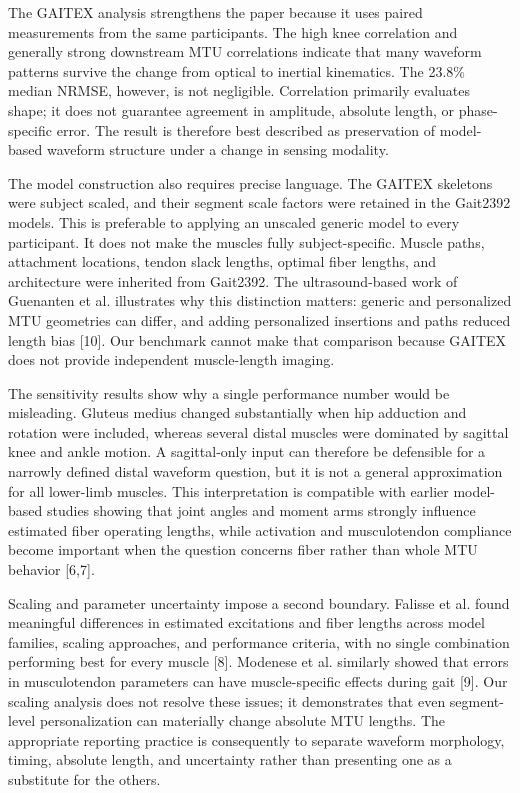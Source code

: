 \documentclass[11pt]{article}
\begin{document}
The GAITEX analysis strengthens the paper because it uses paired measurements from the same participants. The high knee correlation and generally strong downstream MTU correlations indicate that many waveform patterns survive the change from optical to inertial kinematics. The 23.8\% median NRMSE, however, is not negligible. Correlation primarily evaluates shape; it does not guarantee agreement in amplitude, absolute length, or phase-specific error. The result is therefore best described as preservation of model-based waveform structure under a change in sensing modality.

The model construction also requires precise language. The GAITEX skeletons were subject scaled, and their segment scale factors were retained in the Gait2392 models. This is preferable to applying an unscaled generic model to every participant. It does not make the muscles fully subject-specific. Muscle paths, attachment locations, tendon slack lengths, optimal fiber lengths, and architecture were inherited from Gait2392. The ultrasound-based work of Guenanten et al. illustrates why this distinction matters: generic and personalized MTU geometries can differ, and adding personalized insertions and paths reduced length bias [10]. Our benchmark cannot make that comparison because GAITEX does not provide independent muscle-length imaging.

The sensitivity results show why a single performance number would be misleading. Gluteus medius changed substantially when hip adduction and rotation were included, whereas several distal muscles were dominated by sagittal knee and ankle motion. A sagittal-only input can therefore be defensible for a narrowly defined distal waveform question, but it is not a general approximation for all lower-limb muscles. This interpretation is compatible with earlier model-based studies showing that joint angles and moment arms strongly influence estimated fiber operating lengths, while activation and musculotendon compliance become important when the question concerns fiber rather than whole MTU behavior [6,7].

Scaling and parameter uncertainty impose a second boundary. Falisse et al. found meaningful differences in estimated excitations and fiber lengths across model families, scaling approaches, and performance criteria, with no single combination performing best for every muscle [8]. Modenese et al. similarly showed that errors in musculotendon parameters can have muscle-specific effects during gait [9]. Our scaling analysis does not resolve these issues; it demonstrates that even segment-level personalization can materially change absolute MTU lengths. The appropriate reporting practice is consequently to separate waveform morphology, timing, absolute length, and uncertainty rather than presenting one as a substitute for the others.
\end{document}
